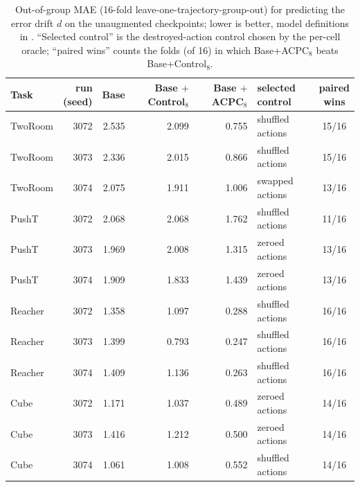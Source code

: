 \begin{table}[!htb]
\centering
\caption{Out-of-group MAE (16-fold leave-one-trajectory-group-out) for predicting the error drift $d$ on the unaugmented checkpoints; lower is better, model definitions in . ``Selected control'' is the destroyed-action control chosen by the per-cell oracle; ``paired wins'' counts the folds (of 16) in which Base+ACPC$_8$ beats Base+Control$_8$.}
\label{tab:target-aligned-acpc-absolute}
\footnotesize
\setlength{\tabcolsep}{3.2pt}
\begin{tabular}{lrrrrlc}
\toprule
Task & \shortstack{run\\(seed)} & Base & \shortstack{Base\\$+$Control$_8$} & \shortstack{Base\\$+$ACPC$_8$} & \shortstack{selected\\control} & \shortstack{paired\\wins} \\
\midrule
TwoRoom & 3072 & 2.535 & 2.099 & 0.755 & shuffled actions & 15/16 \\
TwoRoom & 3073 & 2.336 & 2.015 & 0.866 & shuffled actions & 15/16 \\
TwoRoom & 3074 & 2.075 & 1.911 & 1.006 & swapped actions & 13/16 \\
\addlinespace[1pt]
PushT & 3072 & 2.068 & 2.068 & 1.762 & shuffled actions & 11/16 \\
PushT & 3073 & 1.969 & 2.008 & 1.315 & zeroed actions & 13/16 \\
PushT & 3074 & 1.909 & 1.833 & 1.439 & zeroed actions & 13/16 \\
\addlinespace[1pt]
Reacher & 3072 & 1.358 & 1.097 & 0.288 & shuffled actions & 16/16 \\
Reacher & 3073 & 1.399 & 0.793 & 0.247 & shuffled actions & 16/16 \\
Reacher & 3074 & 1.409 & 1.136 & 0.263 & shuffled actions & 16/16 \\
\addlinespace[1pt]
Cube & 3072 & 1.171 & 1.037 & 0.489 & zeroed actions & 14/16 \\
Cube & 3073 & 1.416 & 1.212 & 0.500 & zeroed actions & 14/16 \\
Cube & 3074 & 1.061 & 1.008 & 0.552 & shuffled actions & 14/16 \\
\bottomrule
\end{tabular}
\end{table}
